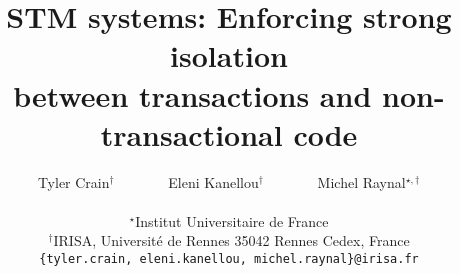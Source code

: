 \documentclass[11pt,letterpaper]{article}
\begin{document}
\newlength {\squarewidth}
\renewenvironment {square}
{
\setlength {\squarewidth} {\linewidth}
\addtolength {\squarewidth} {-12pt}
\renewcommand{\baselinestretch}{0.75} \footnotesize
\begin {center}
\begin {tabular} {|c|} \hline
\begin {minipage} {\squarewidth}
\medskip
}{
\end {minipage}
\\ \hline
\end{tabular}
\end{center}
}  
 
\newtheorem{definition}{Definition}
\newtheorem{theorem}{Theorem}
\newtheorem{lemma}{Lemma}
\newtheorem{corollary}{Corollary}
\newcommand{\toto}{xxx}
\newenvironment{proofT}{\noindent{\bf
Proof }} {\hspace*{\fill}$\Box_{Theorem~\ref{\toto}}$\par\vspace{3mm}}
\newenvironment{proofL}{\noindent{\bf
Proof }} {\hspace*{\fill}$\Box_{Lemma~\ref{\toto}}$\par\vspace{3mm}}
\newenvironment{proofC}{\noindent{\bf
Proof }} {\hspace*{\fill}$\Box_{Corollary~\ref{\toto}}$\par\vspace{3mm}}


\newcommand{\linenumbering}{\ifthenelse{\value{linecounter}<10}
{(0\arabic{linecounter})}{(\arabic{linecounter})}}
\renewcommand{\line}[1]{\refstepcounter{linecounter}\label{#1}\linenumbering}
\newcommand{\resetline}[1]{\setcounter{linecounter}{0}#1}
\renewcommand{\thelinecounter}{\ifnum \value{linecounter} > 
9\else 0\fi \arabic{linecounter}}


\title{\bf STM systems: Enforcing strong isolation\\
           between transactions and non-transactional code}

\author{Tyler Crain$^{\dag}$
~~~~~~~Eleni Kanellou$^{\dag}$
~~~~~~~Michel  Raynal$^{\star,\dag}$
\\~\\
$^{\star}$Institut Universitaire de France\\
$^{\dag}$IRISA, Universit\'e de Rennes 35042 Rennes Cedex, France \\
{\small {\tt \{tyler.crain, eleni.kanellou, michel.raynal\}@irisa.fr}}
}
\end{document}
